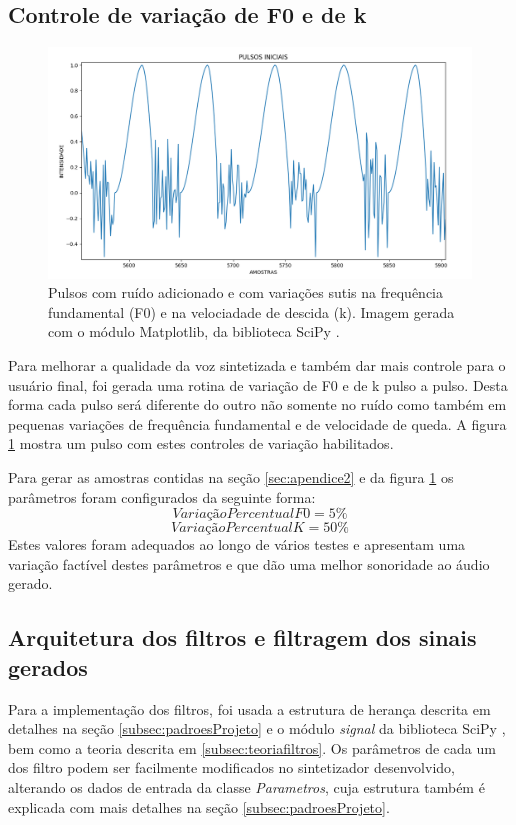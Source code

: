 \documentclass[
  12pt,       
  openright,      
  twoside,      
  a4paper,      
  english,      
  french,       
  spanish,      
  brazil,     
  ]{abntex2}
\begin{document}
\subsection{Controle de variação de F0 e de k}
\begin{figure}
\includegraphics[width=\textwidth,keepaspectratio]{imagens/pulsos_ft_variacoes.PNG}
\caption{Pulsos com ruído adicionado e com variações sutis na frequência fundamental (F0) e na velociadade de descida (k). Imagem gerada com o módulo Matplotlib, da biblioteca SciPy \cite{scipy}.}
\label{fig:pulsosComVariacoes}
\end{figure}
Para melhorar a qualidade da voz sintetizada e também dar mais controle para o usuário final, foi gerada uma rotina de variação de F0 e de k pulso a pulso. Desta forma cada pulso será diferente do outro não somente no ruído como também em pequenas variações de frequência fundamental e de velocidade de queda. A figura \ref{fig:pulsosComVariacoes} mostra um pulso com estes controles de variação habilitados.

Para gerar as amostras contidas na seção \ref{sec:apendice2} e da figura \ref{fig:pulsosComVariacoes} os parâmetros foram configurados da seguinte forma:
\begin{equation}
VariaçãoPercentualF0 = 5\%
\end{equation}
\begin{equation}
VariaçãoPercentualK = 50\%
\end{equation}
Estes valores foram adequados ao longo de vários testes e apresentam uma variação factível destes parâmetros e que dão uma melhor sonoridade ao áudio gerado.

\subsection{Arquitetura dos filtros e filtragem dos sinais gerados}
Para a implementação dos filtros, foi usada a estrutura de herança descrita em detalhes na seção \ref{subsec:padroesProjeto} e o módulo \textit{signal} da biblioteca SciPy \cite{scipy}, bem como a teoria descrita em \ref{subsec:teoriafiltros}. Os parâmetros de cada um dos filtro podem ser facilmente modificados no sintetizador desenvolvido, alterando os dados de entrada da classe \textit{Parametros}, cuja estrutura também é explicada com mais detalhes na seção \ref{subsec:padroesProjeto}.
\end{document}
